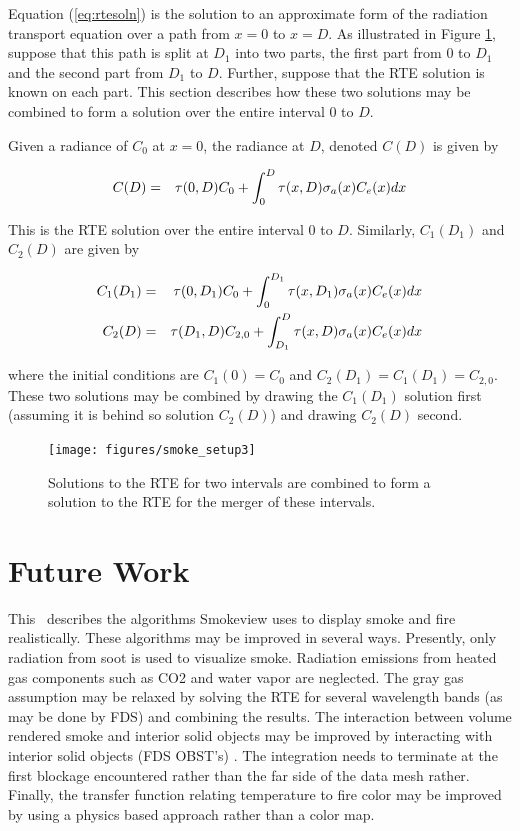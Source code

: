 Equation (\ref{eq:rtesoln}) is the solution to an approximate form of the radiation transport equation over a path from $x=0$ to $x=D$.  As illustrated in Figure \ref{figsmokesetup3}, suppose that this path is split at $D_1$ into two parts, the first part from $0$ to $D_1$ and the second part from $D_1$ to $D$. Further, suppose that the RTE solution is known on each part. This section describes how these two solutions may be combined to form a solution over the entire interval $0$ to $D$.

Given a radiance of $C_0$ at $x=0$, the radiance at $D$, denoted $C(D)$ is given by

\begin{eqnarray}
\label{eq:rtesoln2}
C(D)&=&\tau(0,D)C_0 + \int_0^D\tau(x,D)\sigma_a(x)C_e(x) dx
\end{eqnarray}

This is the RTE solution over the entire interval $0$ to $D$. Similarly, $C_1(D_1)$ and $C_2(D)$ are given by

\begin{eqnarray*}
C_1(D_1)&=&\tau(0,D_1)C_0 + \int_0^{D_1}\tau(x,D_1)\sigma_a(x)C_e(x) dx\\
C_2(D)&=&\tau(D_1,D)C_{2,0} + \int_{D_1}^{D}\tau(x,D)\sigma_a(x)C_e(x) dx
\end{eqnarray*}

where the initial conditions are $C_1(0)=C_0$ and $C_2(D_1)=C_1(D_1)=C_{2,0}$.  These two solutions may be combined by drawing the $C_1(D_1)$ solution first (assuming it is behind so solution $C_2(D)$) and drawing $C_2(D)$ second.


\begin{figure}[\figoptions]
\begin{center}
\texttt{[image: figures/smoke\_setup3]}
\end{center}
\caption {Solutions to the RTE for two intervals are combined to form a solution to the RTE
for the merger of these intervals.
}
\label{figsmokesetup3}
\end{figure}

\section{Future Work}
This \paper\ describes the algorithms Smokeview uses to display smoke and fire realistically.  These algorithms may be improved in several ways.  Presently, only radiation from soot is used to visualize smoke.  Radiation emissions from heated gas components such as CO2 and water vapor are neglected.  The gray gas assumption may be relaxed by solving the RTE for several wavelength bands (as may be done by FDS) and combining the results.  The interaction between volume rendered smoke and interior solid objects may be improved by interacting with interior solid objects (FDS OBST's) .  The integration needs to terminate at the first blockage encountered rather than the far side of the data mesh rather.  Finally, the transfer function relating temperature to fire color may be improved by using a physics based approach rather than a color map.


